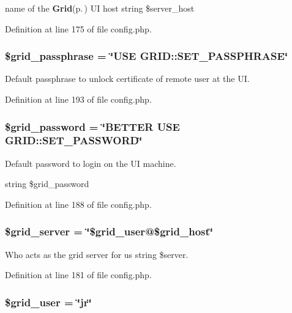 name of the {\bf Grid}{\rm (p.\,\pageref{classGrid})} UI host  string \$server\_\-host 



Definition at line 175 of file config.php.
\subsubsection{\setlength{\rightskip}{0pt plus 5cm}\$grid\_\-passphrase = \char`\"{}USE GRID::SET\_\-PASSPHRASE\char`\"{}}\label{config_8php_a19}


Default passphrase to unlock certificate of remote user at the UI. 



Definition at line 193 of file config.php.
\subsubsection{\setlength{\rightskip}{0pt plus 5cm}\$grid\_\-password = \char`\"{}BETTER USE GRID::SET\_\-PASSWORD\char`\"{}}\label{config_8php_a18}


Default password to login on the UI machine. 

string \$grid\_\-password 

Definition at line 188 of file config.php.
\subsubsection{\setlength{\rightskip}{0pt plus 5cm}\$grid\_\-server = \char`\"{}\$grid\_\-user@\$grid\_\-host\char`\"{}}\label{config_8php_a17}


Who acts as the grid server for us  string \$server. 



Definition at line 181 of file config.php.
\subsubsection{\setlength{\rightskip}{0pt plus 5cm}\$grid\_\-user = \char`\"{}jr\char`\"{}}\label{config_8php_a15}


